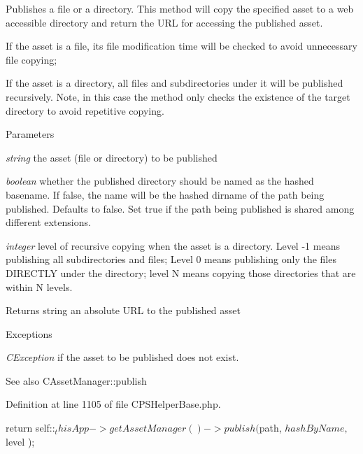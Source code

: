 Publishes a file or a directory. This method will copy the specified asset to a web accessible directory and return the URL for accessing the published asset. 
\begin{DoxyItemize}
\item If the asset is a file, its file modification time will be checked to avoid unnecessary file copying; 
\item If the asset is a directory, all files and subdirectories under it will be published recursively. Note, in this case the method only checks the existence of the target directory to avoid repetitive copying. 
\end{DoxyItemize}
\begin{DoxyParams}{Parameters}
\item[{\em string}]the asset (file or directory) to be published \item[{\em boolean}]whether the published directory should be named as the hashed basename. If false, the name will be the hashed dirname of the path being published. Defaults to false. Set true if the path being published is shared among different extensions. \item[{\em integer}]level of recursive copying when the asset is a directory. Level -\/1 means publishing all subdirectories and files; Level 0 means publishing only the files DIRECTLY under the directory; level N means copying those directories that are within N levels. \end{DoxyParams}
\begin{DoxyReturn}{Returns}
string an absolute URL to the published asset 
\end{DoxyReturn}

\begin{DoxyExceptions}{Exceptions}
\item[{\em CException}]if the asset to be published does not exist. \end{DoxyExceptions}
\begin{DoxySeeAlso}{See also}
CAssetManager::publish 
\end{DoxySeeAlso}


Definition at line 1105 of file CPSHelperBase.php.




\begin{DoxyCode}
    {
        return self::$_thisApp->getAssetManager()->publish( $path, $hashByName, $
      level );
    }
\end{DoxyCode}


